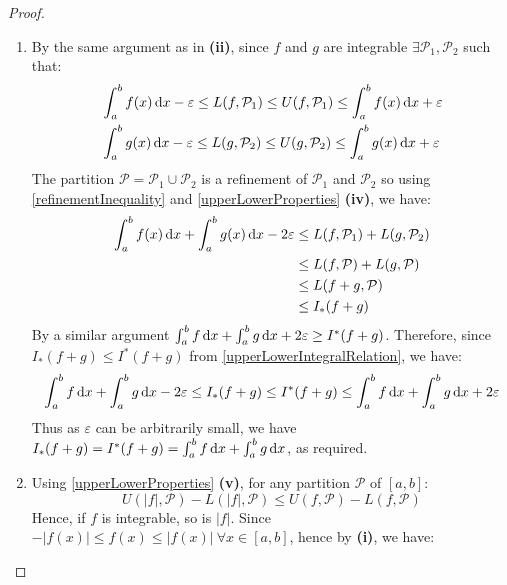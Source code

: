 \documentclass[../main.tex]{subfiles}
\begin{document}
\begin{proof}
\begin{enumerate}
      Since we have shown the result for $\lambda \geq 0$ and $\lambda = -1$, the result follows for all $\lambda \in \R$ by combining the above.
    \item By the same argument as in \textbf{(ii)}, since $f$ and $g$ are integrable $\exists \mathcal{P}_1, \mathcal{P}_2$ such that:
      \begin{align*}
        &\int_{a}^{b} f(x) \d{x} -\varepsilon \leq L(f, \mathcal{P}_1) \leq U(f, \mathcal{P}_1) \leq \int_{a}^{b} f(x) \d{x} + \varepsilon \\
        &\int_{a}^{b} g(x) \d{x} -\varepsilon \leq L(g, \mathcal{P}_2) \leq U(g, \mathcal{P}_2) \leq \int_{a}^{b} g(x) \d{x} + \varepsilon
      \end{align*}
      The partition $\mathcal{P} = \mathcal{P}_1 \cup \mathcal{P}_2$ is a refinement of $\mathcal{P}_1$ and $\mathcal{P}_2$ so using \cref{refinementInequality} and \cref{upperLowerProperties} \textbf{(iv)}, we have:
      \begin{align*}
        \int_{a}^{b} f(x) \d{x} + \int_{a}^{b} g(x) \d{x} - 2\varepsilon &\leq L(f, \mathcal{P}_1) + L(g, \mathcal{P}_2) \\
                                                                         &\leq L(f, \mathcal{P}) + L(g, \mathcal{P}) \\
                                                                         &\leq L(f + g, \mathcal{P}) \\
                                                                         &\leq I_{*}(f + g)
      \end{align*}
      By a similar argument $\int_{a}^{b} f \d{x} + \int_{a}^{b} g \d{x} + 2\varepsilon \geq I^{*}(f + g)$.
      Therefore, since $I_{*}(f + g) \leq I^{*}(f + g)$ from \cref{upperLowerIntegralRelation}, we have:
      \[
        \int_{a}^{b} f \d{x} + \int_{a}^{b} g \d{x} - 2\varepsilon \leq I_{*}(f + g) \leq I^{*}(f + g) \leq \int_{a}^{b} f \d{x} + \int_{a}^{b} g \d{x} + 2\varepsilon
      \]
      Thus as $\varepsilon$ can be arbitrarily small, we have $I_{*}(f + g) = I^{*}(f + g) = \int_{a}^{b} f \d{x} + \int_{a}^{b} g \d{x}$, as required.
    \item Using \cref{upperLowerProperties} \textbf{(v)}, for any partition $\mathcal{P}$ of $[a, b]$:
      \[
        U(|f|, \mathcal{P}) - L(|f|, \mathcal{P}) \leq U(f, \mathcal{P}) - L(f, \mathcal{P})
      \]
      Hence, if $f$ is integrable, so is $|f|$.
      Since $-|f(x)| \leq f(x) \leq |f(x)|\ \forall x \in [a, b]$, hence by \textbf{(i)}, we have:

\end{enumerate}
\end{proof}
\end{document}
